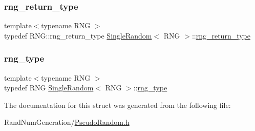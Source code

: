 \hypertarget{struct_single_random_a34726d0dbd0e41d5efca1c5890400675}{}\label{struct_single_random_a34726d0dbd0e41d5efca1c5890400675} 
\subsubsection{\texorpdfstring{rng\+\_\+return\+\_\+type}{rng\_return\_type}}
{\footnotesize\ttfamily template$<$typename R\+NG $>$ \\
typedef R\+N\+G\+::rng\+\_\+return\+\_\+type \hyperlink{struct_single_random}{Single\+Random}$<$ R\+NG $>$\+::\hyperlink{struct_single_random_a34726d0dbd0e41d5efca1c5890400675}{rng\+\_\+return\+\_\+type}}

\hypertarget{struct_single_random_a779e253bef5bae088b1a5eeae8d97c52}{}\label{struct_single_random_a779e253bef5bae088b1a5eeae8d97c52} 
\subsubsection{\texorpdfstring{rng\+\_\+type}{rng\_type}}
{\footnotesize\ttfamily template$<$typename R\+NG $>$ \\
typedef R\+NG \hyperlink{struct_single_random}{Single\+Random}$<$ R\+NG $>$\+::\hyperlink{struct_single_random_a779e253bef5bae088b1a5eeae8d97c52}{rng\+\_\+type}}



The documentation for this struct was generated from the following file\+:\begin{DoxyCompactItemize}
\item 
Rand\+Num\+Generation/\hyperlink{_pseudo_random_8h}{Pseudo\+Random.\+h}\end{DoxyCompactItemize}
